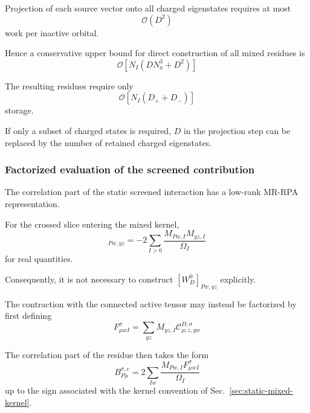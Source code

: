 \documentclass[aip,jcp,reprint,noshowkeys,superscriptaddress]{revtex4-1}
\begin{document}
Projection of each source vector onto all charged eigenstates requires
at most
\begin{equation}
  \mathcal O(D^2)
\end{equation}
work per inactive orbital.

Hence a conservative upper bound for direct construction of all mixed
residues is
\begin{equation}
  \mathcal O
  \left[
    N_I
    \left(
      DN_a^3+D^2
    \right)
  \right]
  \label{eq:B-direct-cost}
\end{equation}

The resulting residues require only
\begin{equation}
  \mathcal O
  \left[
    N_I(D_++D_-)
  \right]
  \label{eq:B-memory}
\end{equation}
storage.

If only a subset of charged states is required, $D$ in the projection
step can be replaced by the number of retained charged eigenstates.


\subsubsection{Factorized evaluation of the screened contribution}

The correlation part of the static screened interaction has a low-rank
MR-RPA representation.

For the crossed slice entering the mixed kernel,
\begin{equation}
  [w_D^c(0)]_{Pw,yz}
  =
  -
  2
  \sum_{I>0}
  \frac{
    M_{Pw,I}M_{yz,I}
  }{
    \Omega_I
  }
\end{equation}
for real quantities.

Consequently, it is not necessary to construct
$[W_D^0]_{Pw,yz}$ explicitly.

The contraction with the connected active tensor may instead be
factorized by first defining
\begin{equation}
  F_{\mu w I}^{\sigma}
  =
  \sum_{yz}
  M_{yz,I}
  \mathcal C_{\mu;z,yw}^{D,\sigma}
  \label{eq:F-factor}
\end{equation}

The correlation part of the residue then takes the form
\begin{equation}
  B_{P\mu}^{\sigma,c}
  =
  2
  \sum_{Iw}
  \frac{
    M_{Pw,I}
    F_{\mu w I}^{\sigma}
  }{
    \Omega_I
  }
  \label{eq:B-factorized}
\end{equation}
up to the sign associated with the kernel convention of
Sec.~\ref{sec:static-mixed-kernel}.
\end{document}
